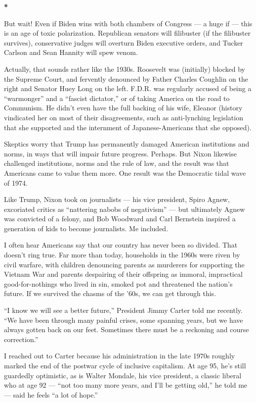 \textbf{*}

But wait! Even if Biden wins with both chambers of Congress --- a huge
if --- this is an age of toxic polarization. Republican senators will
filibuster (if the filibuster survives), conservative judges will
overturn Biden executive orders, and Tucker Carlson and Sean Hannity
will spew venom.

Actually, that sounds rather like the 1930s. Roosevelt was (initially)
blocked by the Supreme Court, and fervently denounced by Father Charles
Coughlin on the right and Senator Huey Long on the left. F.D.R. was
regularly accused of being a ``warmonger'' and a ``fascist dictator,''
or of taking America on the road to Communism. He didn't even have the
full backing of his wife, Eleanor (history vindicated her on most of
their disagreements, such as anti-lynching legislation that she
supported and the internment of Japanese-Americans that she opposed).

Skeptics worry that Trump has permanently damaged American institutions
and norms, in ways that will impair future progress. Perhaps. But Nixon
likewise challenged institutions, norms and the rule of law, and the
result was that Americans came to value them more. One result was the
Democratic tidal wave of 1974.

Like Trump, Nixon took on journalists --- his vice president, Spiro
Agnew, excoriated critics as ``nattering nabobs of negativism'' --- but
ultimately Agnew was convicted of a felony, and Bob Woodward and Carl
Bernstein inspired a generation of kids to become journalists. Me
included.

I often hear Americans say that our country has never been so divided.
That doesn't ring true. Far more than today, households in the 1960s
were riven by civil warfare, with children denouncing parents as
murderers for supporting the Vietnam War and parents despairing of their
offspring as immoral, impractical good-for-nothings who lived in sin,
smoked pot and threatened the nation's future. If we survived the chasms
of the '60s, we can get through this.

``I know we will see a better future,'' President Jimmy Carter told me
recently. ``We have been through many painful crises, some spanning
years, but we have always gotten back on our feet. Sometimes there must
be a reckoning and course correction.''

I reached out to Carter because his administration in the late 1970s
roughly marked the end of the postwar cycle of inclusive capitalism. At
age 95, he's still guardedly optimistic, as is Walter Mondale, his vice
president, a classic liberal who at age 92 --- ``not too many more
years, and I'll be getting old,'' he told me --- said he feels ``a lot
of hope.''

